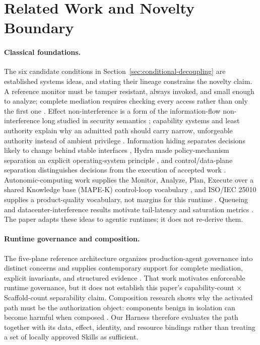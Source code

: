 \section{Related Work and Novelty Boundary}
\label{sec:related}

\paragraph{Classical foundations.}
The six candidate conditions in Section~\ref{sec:conditional-decoupling} are established systems ideas, and stating their lineage constrains the novelty claim. A reference monitor must be tamper resistant, always invoked, and small enough to analyze; complete mediation requires checking every access rather than only the first one \cite{anderson1972reference,saltzer1975protection}. Effect non-interference is a form of the information-flow non-interference long studied in security semantics \cite{goguen1982noninterference}; capability systems and least authority explain why an admitted path should carry narrow, unforgeable authority instead of ambient privilege \cite{miller2003capability}. Information hiding separates decisions likely to change behind stable interfaces \cite{parnas1972criteria}, Hydra made policy-mechanism separation an explicit operating-system principle \cite{levin1975hydra}, and control/data-plane separation distinguishes decisions from the execution of accepted work \cite{kreutz2015sdn}. Autonomic-computing work supplies the Monitor, Analyze, Plan, Execute over a shared Knowledge base (MAPE-K) control-loop vocabulary \cite{kephart2003autonomic,ibm2006autonomic}, and ISO/IEC 25010 supplies a product-quality vocabulary, not margins for this runtime \cite{iso25010}. Queueing and datacenter-interference results motivate tail-latency and saturation metrics \cite{kleinrock1975queueing,mars2011bubbleup,dean2013tail}. The paper adapts these ideas to agentic runtimes; it does not re-derive them.

\paragraph{Runtime governance and composition.}
The five-plane reference architecture organizes production-agent governance into distinct concerns and supplies contemporary support for complete mediation, explicit invariants, and structured evidence \cite{tallam2026fiveplane}. That work motivates enforceable runtime governance, but it does not establish this paper's capability-count $\times$ Scaffold-count separability claim. Composition research shows why the activated path must be the authorization object: components benign in isolation can become harmful when composed \cite{xie2026composition}. Our Harness therefore evaluates the path together with its data, effect, identity, and resource bindings rather than treating a set of locally approved Skills as sufficient.

